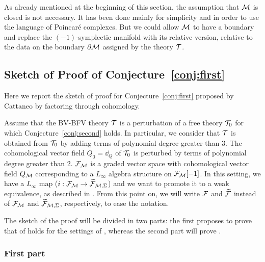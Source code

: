 As already mentioned at the beginning of this section, the assumption that $\mathcal{M}$ is closed is not necessary.
It has been done mainly for simplicity and in order to use the language of Poincaré complexes.
But we could allow $\mathcal{M}$ to have a boundary and replace the $(-1)$-symplectic manifold with its relative version, relative to the data on the boundary $\partial \mathcal{M}$ assigned by the theory $\mathcal{T}$.

\subsection{Sketch of Proof of Conjecture~\ref{conj:first}}
\label{subsec:sketch_proof}

Here we report the sketch of proof for Conjecture~\ref{conj:first} proposed by Cattaneo \etal by factoring through cohomology.

Assume that the BV-BFV theory $\mathcal{T}$ is a perturbation of a free theory $\mathcal{T}_0$ for which Conjecture~\ref{conj:second} holds.
In particular, we consider that $\mathcal{T}$ is obtained from $\mathcal{T}_0$ by adding terms of polynomial degree greater than 3.
The cohomological vector field $Q_0 = \dd_Q$ of $\mathcal{T}_0$ is perturbed by terms of polynomial degree greater than 2.
$\mathcal{F}_{\mathcal{M}}$ is a graded vector space with cohomological vector field $Q_{\mathcal{M}}$ corresponding to a $L_\infty$ algebra structure on $\mathcal{F}_{\mathcal{M}}[-1]$.
In this setting, we have a $L_\infty$ map ($i:\mathcal{F}_{\mathcal{M}} \rightarrow \widetilde{\mathcal{F}}_{\mathcal{M}, \Sigma}$) and we want to promote it to a weak equivalence, as described in .
From this point on, we will write $\mathcal{F}$ and $\widetilde{\mathcal{F}}$ instead of $\mathcal{F}_{\mathcal{M}}$ and $\widetilde{\mathcal{F}}_{\mathcal{M}, \Sigma}$, respectively, to ease the notation.

The sketch of the proof will be divided in two parts: the first proposes to prove that  of  holds for the settings of , whereas the second part will prove .

\subsubsection{First part}
\label{subsubsec:first_part}

